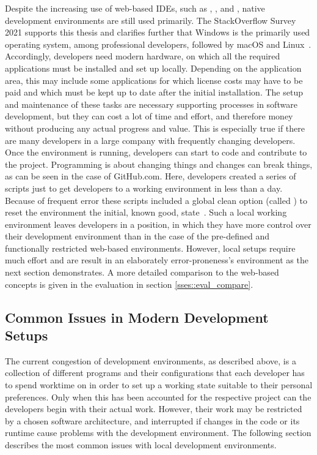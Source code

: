     Despite the increasing use of web-based \ac{IDE}s, such as , ,  and , native development environments are still used primarily. The StackOverflow Survey 2021 supports this thesis and clarifies further that Windows is the primarily used operating system, among professional developers, followed by macOS and Linux~\cite{stackoverflow2021}. Accordingly, developers need modern hardware, on which all the required applications must be installed and set up locally. Depending on the application area, this may include some applications for which license costs may have to be paid and which must be kept up to date after the initial installation. The setup and maintenance of these tasks are necessary supporting processes in software development, but they can cost a lot of time and effort, and therefore money without producing any actual progress and value. This is especially true if there are many developers in a large company with frequently changing developers. Once the environment is running, developers can start to code and contribute to the project. Programming is about changing things and changes can break things, as can be seen in the case of GitHub.com. Here, developers created a series of scripts just to get developers to a working environment in less than a day. Because of frequent error these scripts included a global clean option (called ) to reset the environment the initial, known good, state~\cite{githubblogcodespace}.\newline
    Such a local working environment leaves developers in a position, in which they have more control over their development environment than in the case of the pre-defined and functionally restricted web-based environments.
    However, local setups require much effort and are result in an elaborately error-proneness's environment as the next section demonstrates. A more detailed comparison to the web-based concepts is given in the evaluation in section \ref{sses::eval_compare}.

    \subsection{Common Issues in Modern Development Setups}
    The current congestion of development environments, as described above, is a collection of different programs and their configurations that each developer has to spend worktime on in order to set up a working state suitable to their personal preferences. Only when this has been accounted for the respective project can the developers begin with their actual work. However, their work may be restricted by a chosen software architecture, and interrupted if changes in the code or its runtime cause problems with the development environment. The following section describes the most common issues with local development environments.

